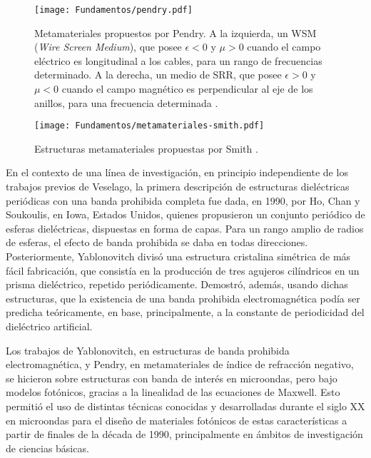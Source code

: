 \begin{figure}[htp]
	\centering
	\texttt{[image: Fundamentos/pendry.pdf]}
	\caption{Metamateriales propuestos por Pendry. A la izquierda, un WSM (\textit{Wire Screen Medium}), que posee $\epsilon<0$ y $\mu>0$ cuando el campo eléctrico es longitudinal a los cables, para un rango de frecuencias determinado. A la derecha, un medio de SRR, que posee $\epsilon>0$ y $\mu<0$ cuando el campo magnético es perpendicular al eje de los anillos, para una frecuencia determinada \cite{Caloz:ElectromagneticMetamaterials}.}
	\label{fig:Pendry}
\end{figure}

\begin{figure}[htp]
	\centering
	\texttt{[image: Fundamentos/metamateriales-smith.pdf]}
	\caption{Estructuras metamateriales propuestas por Smith \cite{Caloz:ElectromagneticMetamaterials}.}
	\label{fig:metamaterial-de-smith}
\end{figure}

En el contexto de una línea de investigación, en principio independiente de los trabajos previos de Veselago, la primera descripción de estructuras dieléctricas periódicas con una banda prohibida completa fue dada, en 1990, por Ho, Chan y Soukoulis, en Iowa, Estados Unidos, quienes propusieron un conjunto periódico de esferas dieléctricas, dispuestas en forma de capas. Para un rango amplio de radios de esferas, el efecto de banda prohibida se daba en todas direcciones. Posteriormente, Yablonovitch divisó una estructura cristalina simétrica de más fácil fabricación, que consistía en la producción de tres agujeros cilíndricos en un prisma dieléctrico, repetido periódicamente. Demostró, además, usando dichas estructuras, que la existencia de una banda prohibida electromagnética podía ser predicha teóricamente, en base, principalmente, a la constante de periodicidad del dieléctrico artificial.

Los trabajos de Yablonovitch, en estructuras de banda prohibida electromagnética, y Pendry, en metamateriales de índice de refracción negativo, se hicieron sobre estructuras con banda de interés en microondas, pero bajo modelos fotónicos, gracias a la linealidad de las ecuaciones de Maxwell. Esto permitió el uso de distintas técnicas conocidas y desarrolladas durante el siglo XX en microondas para el diseño de materiales fotónicos de estas características a partir de finales de la década de 1990, principalmente en ámbitos de investigación de ciencias básicas.

